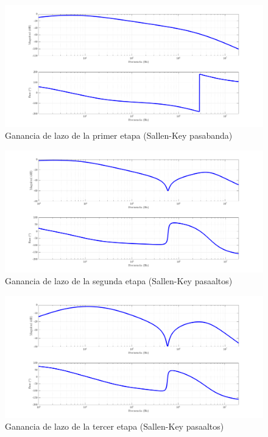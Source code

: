\begin{figure}[H]
	\centering
	\includegraphics[width = \textwidth]{imagenes/estabilidad_etapa_1_v1}
	\caption{Ganancia de lazo de la primer etapa (Sallen-Key pasabanda)}
	\label{fig:loop_gain_1}
\end{figure}
\begin{figure}[H]
	\centering
	\includegraphics[width = \textwidth]{imagenes/estabilidad_etapa_2_v1}
	\caption{Ganancia de lazo de la segunda etapa (Sallen-Key pasaaltos)}
	\label{fig:loop_gain_2}
\end{figure}
\begin{figure}[H]
	\centering
	\includegraphics[width = \textwidth]{imagenes/estabilidad_etapa_3_v1}
	\caption{Ganancia de lazo de la tercer etapa (Sallen-Key pasaaltos)}
	\label{fig:loop_gain_3}
\end{figure}
